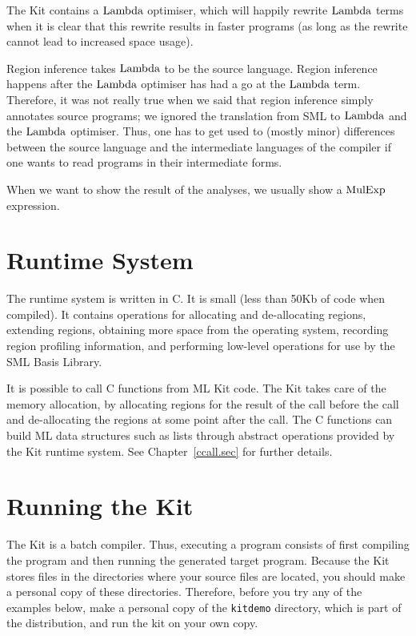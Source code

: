 \documentclass[12pt]{book}
\begin{document}
The Kit contains a 
%
$\hbox{\rm Lambda}$ optimiser, which will happily rewrite $\hbox{\rm Lambda}$ terms when it is
clear that this rewrite results in faster programs (as long as the
rewrite cannot lead to increased space usage).

Region inference takes $\hbox{\rm Lambda}$ to be the source language. Region inference happens after
the $\hbox{\rm Lambda}$ optimiser has had a go at the $\hbox{\rm Lambda}$ term. 
Therefore, it was not really true when we said that region inference simply annotates source
programs;  we ignored the translation from SML to $\hbox{\rm Lambda}$ and
the $\hbox{\rm Lambda}$ optimiser. Thus, one has to get used to (mostly minor) differences between
the source language and the intermediate languages of the compiler if one wants to read
programs in their intermediate forms.

When we want to show the result of the analyses, we usually show a $\hbox{\rm MulExp}$ expression.

\section{Runtime System}
The 
%
runtime system is written in C. It is small (less than 50Kb of code
when compiled).  It contains operations for allocating and
de-allocating regions, extending regions, obtaining more space from
the operating system, recording region profiling information, and
performing low-level operations for use by the SML Basis Library.

It is possible to call C functions from ML Kit code.
The Kit takes care of the memory allocation, by allocating regions for
the result of the call before the call and de-allocating the regions
at some point after the call. The C functions can build ML data
structures such as lists through abstract operations provided by the
Kit runtime system. See Chapter~\ref{ccall.sec} for further details.

\section{Running the Kit}
\label{tryit.sec}

The Kit is a 
%
batch compiler. Thus, executing a program consists of first compiling
the program and then running the generated target program. Because the
Kit stores files in the directories where your source files are
located, you should make a personal copy of these directories.
Therefore, before you try any of the examples below, make a personal
copy of the {\tt kitdemo} directory, which is part of the
distribution, and run the kit on your own copy.
\end{document}
